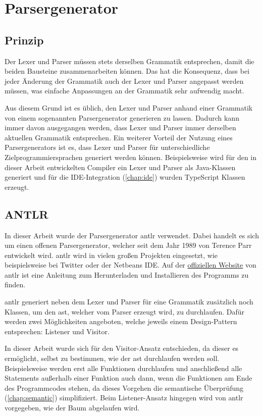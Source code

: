 \section{Parsergenerator}
\subsection{Prinzip}
Der Lexer und Parser müssen stets derselben Grammatik entsprechen, damit die beiden Bausteine zusammenarbeiten können. Das hat die Konsequenz, dass bei jeder Änderung der Grammatik auch der Lexer und Parser angepasst werden müssen, was einfache Anpassungen an der Grammatik sehr aufwendig macht.

Aus diesem Grund ist es üblich, den Lexer und Parser anhand einer Grammatik von einem sogenannten Parsergenerator generieren zu lassen. Dadurch kann immer davon ausgegangen werden, dass Lexer und Parser immer derselben aktuellen Grammatik entsprechen. Ein weiterer Vorteil der Nutzung eines Parsergenerators ist es, dass Lexer und Parser für unterschiedliche Zielprogrammiersprachen generiert werden können. Beispielsweise wird für den in dieser Arbeit entwickelten Compiler ein Lexer und Parser als Java-Klassen generiert und für die IDE-Integration (\cref{chap:ide}) wurden TypeScript Klassen erzeugt.

\subsection{ANTLR} \label{subsec:antlr}
In dieser Arbeit wurde der Parsergenerator \ac{antlr} verwendet. Dabei handelt es sich um einen offenen Parsergenerator, welcher seit dem Jahr 1989 von Terence Parr entwickelt wird. \ac{antlr} wird in vielen großen Projekten eingesetzt, wie beispielsweise bei Twitter oder der Netbeans IDE. \cite{TerenceParr2022} Auf der \href{}{offiziellen Website} von \ac{antlr} ist eine Anleitung zum Herunterladen und Installieren des Programms zu finden. 

\ac{antlr} generiert neben dem Lexer und Parser für eine Grammatik zusätzlich noch Klassen, um den \ac{ast}, welcher vom Parser erzeugt wird, zu durchlaufen. Dafür werden zwei Möglichkeiten angeboten, welche jeweils einem Design-Pattern entsprechen: Listener und Visitor.

In dieser Arbeit wurde sich für den Visitor-Ansatz entschieden, da dieser es ermöglicht, selbst zu bestimmen, wie der \ac{ast} durchlaufen werden soll. Beispielsweise werden erst alle Funktionen durchlaufen und anschließend alle Statements außerhalb einer Funktion auch dann, wenn die Funktionen am Ende des Programmcodes stehen, da dieses Vorgehen die semantische Überprüfung (\cref{chap:semantic}) simplifiziert. Beim Listener-Ansatz hingegen wird von \ac{antlr} vorgegeben, wie der Baum abgelaufen wird.
